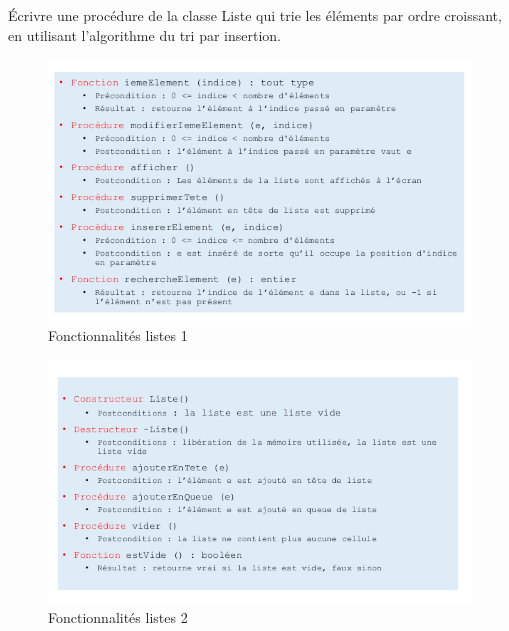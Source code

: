 \documentclass[11pt]{article}
\makeatletter
\def\maxwidth{\ifdim\Gin@nat@width>\linewidth\linewidth
    \else\Gin@nat@width\fi}
\let\Oldincludegraphics\includegraphics
\renewcommand{\includegraphics}[1]{\Oldincludegraphics[width=.8\maxwidth]{#1}}
\makeatother
\begin{document}
Écrivre une procédure de la classe Liste qui trie les éléments par ordre
croissant, en utilisant l'algorithme du tri par insertion.

\begin{figure}
\centering
\includegraphics{fonctionnalites_listes.png}
\caption{Fonctionnalités listes 1}
\end{figure}

\begin{figure}
\centering
\includegraphics{fonctionnalites_listes2.png}
\caption{Fonctionnalités listes 2}
\end{figure}
\end{document}
